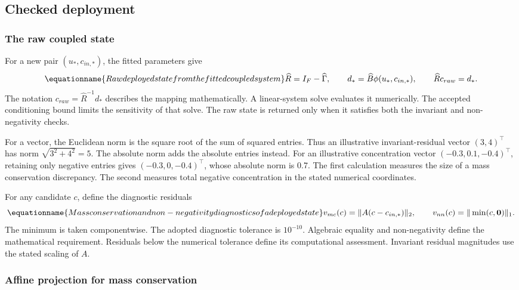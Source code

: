 \subsection{Checked deployment}

\subsubsection{The raw coupled state}

For a new pair \((u_*,c_{in,*})\), the fitted parameters give
\begin{equation}
\equationname{Raw deployed state from the fitted coupled system}
\label{eq:icsor_raw_state}
\widehat R=I_F-\widehat\Gamma,
\qquad d_* =\widehat B\phi(u_*,c_{in,*}),
\qquad \widehat R c_{raw}=d_*.
\end{equation}
The notation \(c_{raw}=\widehat R^{-1}d_*\) describes the mapping mathematically. A linear-system solve evaluates it numerically. The accepted conditioning bound limits the sensitivity of that solve. The raw state is returned only when it satisfies both the invariant and non-negativity checks.

For a vector, the Euclidean norm is the square root of the sum of squared entries. Thus an illustrative invariant-residual vector \((3,4)^\top\) has norm \(\sqrt{3^2+4^2}=5\). The absolute norm adds the absolute entries instead. For an illustrative concentration vector \((-0.3,0.1,-0.4)^\top\), retaining only negative entries gives \((-0.3,0,-0.4)^\top\), whose absolute norm is 0.7. The first calculation measures the size of a mass conservation discrepancy. The second measures total negative concentration in the stated numerical coordinates.

For any candidate \(c\), define the diagnostic residuals
\begin{equation}
\equationname{Mass conservation and non-negativity diagnostics of a deployed state}
\label{eq:icsor_deployment_diagnostics}
v_{mc}(c)=\|A(c-c_{in,*})\|_2,
\qquad
v_{nn}(c)=\|\min(c,\mathbf{0})\|_1.
\end{equation}
The minimum is taken componentwise. The adopted diagnostic tolerance is \(10^{-10}\). Algebraic equality and non-negativity define the mathematical requirement. Residuals below the numerical tolerance define its computational assessment. Invariant residual magnitudes use the stated scaling of \(A\).

\subsubsection{Affine projection for mass conservation}

